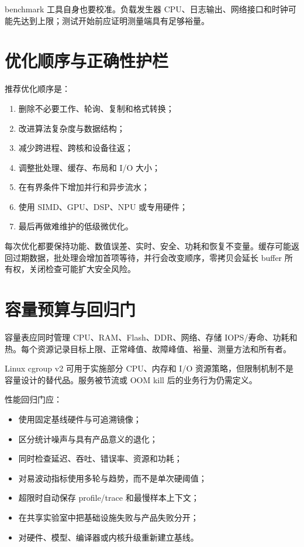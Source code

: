 benchmark 工具自身也要校准。负载发生器 CPU、日志输出、网络接口和时钟可能先达到上限；测试开始前应证明测量端具有足够裕量。

\section{优化顺序与正确性护栏}

推荐优化顺序是：

\begin{enumerate}
  \item 删除不必要工作、轮询、复制和格式转换；
  \item 改进算法复杂度与数据结构；
  \item 减少跨进程、跨核和设备往返；
  \item 调整批处理、缓存、布局和 I/O 大小；
  \item 在有界条件下增加并行和异步流水；
  \item 使用 SIMD、GPU、DSP、NPU 或专用硬件；
  \item 最后再做难维护的低级微优化。
\end{enumerate}

每次优化都要保持功能、数值误差、实时、安全、功耗和恢复不变量。缓存可能返回过期数据，批处理会增加首项等待，并行会改变顺序，零拷贝会延长 buffer 所有权，关闭检查可能扩大安全风险。

\section{容量预算与回归门}

容量表应同时管理 CPU、RAM、Flash、DDR、网络、存储 IOPS/寿命、功耗和热。每个资源记录目标上限、正常峰值、故障峰值、裕量、测量方法和所有者。

Linux cgroup v2 可用于实施部分 CPU、内存和 I/O 资源策略，但限制机制不是容量设计的替代品\cite{linux-cgroup-v2}。服务被节流或 OOM kill 后的业务行为仍需定义。

性能回归门应：

\begin{itemize}
  \item 使用固定基线硬件与可追溯镜像；
  \item 区分统计噪声与具有产品意义的退化；
  \item 同时检查延迟、吞吐、错误率、资源和功耗；
  \item 对易波动指标使用多轮与趋势，而不是单次硬阈值；
  \item 超限时自动保存 profile/trace 和最慢样本上下文；
  \item 在共享实验室中把基础设施失败与产品失败分开；
  \item 对硬件、模型、编译器或内核升级重新建立基线。
\end{itemize}

